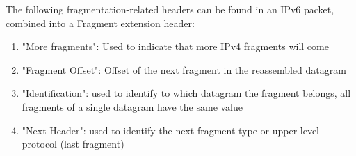 The following fragmentation-related headers can be found in an IPv6 packet, combined into a Fragment extension header:
\begin{enumerate}
    \item "More fragments": Used to indicate that more IPv4 fragments will come
    \item "Fragment Offset": Offset of the next fragment in the reassembled datagram
    \item "Identification": used to identify to which datagram the fragment belongs, all fragments of a single datagram have the same value
    \item "Next Header": used to identify the next fragment type or upper-level protocol (last fragment)
\end{enumerate}